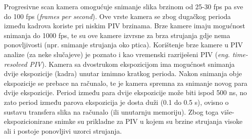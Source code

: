 Progresivne scan kamera omogućuje snimanje slika brzinom od 25-30 fps pa sve do 100 fps (\textit{frames per second}). Ove vrste kamera se zbog dugačkog perioda između kadrova koriste pri niskim PIV brzinama. Brze kamere imaju mogućnost snimanja do 1000 fps, te su ove kamere izvrsne za brza strujanja gdje nema ponovljivosti (npr. snimanje strujanja oko ptica). Korištenje brze kamere u PIV analize (za neke slučajeve) je poznato i kao vremenski razriješeni PIV (\textit{eng. time-resolved PIV}). Kamera sa dvostrukom ekspozicijom ima mogućnost snimanja dvije ekspozicije (kadra) unutar iznimno kratkog perioda. Nakon snimanja obje ekspozicije se prebace na računalo, te je kamera spremna za snimanje novog para dvije ekspozicije. Period između para dvije ekspozicije može biti ispod 500 ns, no zato period između parova ekspozicija je dosta duži (0.1 do 0.5 s), ovisno o sustavu transfera slika na računalo (ili unutarnju memoriju). Zbog toga više-ekspozicionirane snimke su prikladne za PIV u kojem su brzine strujanja visoke ali i postoje ponovljivi uzorci strujanja.
\FloatBarrier
